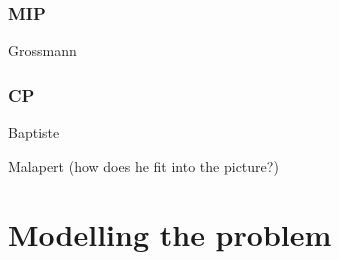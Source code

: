 \documentclass[13pt, letterpaper, twoside]{book}
\begin{document}
\subsection{MIP}
\begin{alist}
    \item{Grossmann}
    \end{alist}
\subsection{CP}
\begin{alist}
    \item{Baptiste}
    \item{Malapert (how does he fit into the picture?)}
\end{alist}
\chapter{Modelling the problem}











\begin{comment}
\chapter{My solution}
\section{MIP formulation improvements}
\section{CP formulation improvements}

\chapter{Discussion}


\pagebreak

\vskip 4em
\end{comment}
\end{document}
